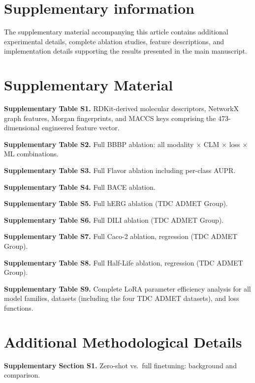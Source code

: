 \documentclass[final,1p,times]{elsarticle}
\begin{document}
\section*{Supplementary information}

The supplementary material accompanying this article contains additional experimental details, complete ablation studies, feature descriptions, and implementation details supporting the results presented in the main manuscript.

\appendix

\section{Supplementary Material}\label{sec:supplementary}

\noindent\textbf{Supplementary Table S1.} RDKit-derived molecular descriptors, NetworkX graph features, Morgan fingerprints, and MACCS keys comprising the 473-dimensional engineered feature vector.

\noindent\textbf{Supplementary Table S2.} Full BBBP ablation: all modality $\times$ CLM $\times$ loss $\times$ ML combinations.

\noindent\textbf{Supplementary Table S3.} Full Flavor ablation including per-class AUPR.

\noindent\textbf{Supplementary Table S4.} Full BACE ablation.

\noindent\textbf{Supplementary Table S5.} Full hERG ablation (TDC ADMET Group).

\noindent\textbf{Supplementary Table S6.} Full DILI ablation (TDC ADMET Group).

\noindent\textbf{Supplementary Table S7.} Full Caco-2 ablation, regression (TDC ADMET Group).

\noindent\textbf{Supplementary Table S8.} Full Half-Life ablation, regression (TDC ADMET Group).

\noindent\textbf{Supplementary Table S9.} Complete LoRA parameter efficiency analysis for all model families, datasets (including the four TDC ADMET datasets), and loss functions.

\section{Additional Methodological Details}\label{sec:supp_methods}

\noindent\textbf{Supplementary Section S1.} Zero-shot vs.\ full finetuning: background and comparison.
\end{document}
